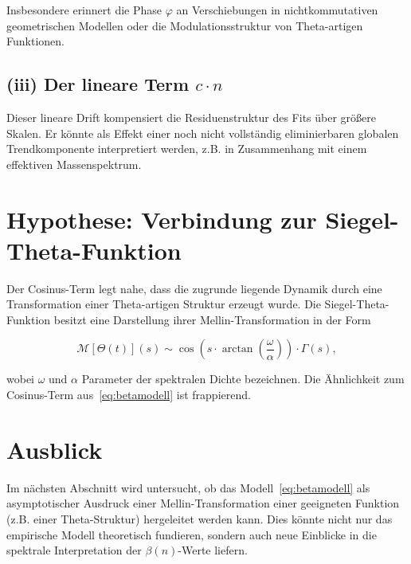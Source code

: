 \documentclass[a4paper,12pt]{article}
\begin{document}
Insbesondere erinnert die Phase $\varphi$ an Verschiebungen in nichtkommutativen geometrischen Modellen oder die Modulationsstruktur von Theta-artigen Funktionen.

\subsection*{(iii) Der lineare Term \boldmath$c \cdot n$}

Dieser lineare Drift kompensiert die Residuenstruktur des Fits über größere Skalen. Er könnte als Effekt einer noch nicht vollständig eliminierbaren globalen Trendkomponente interpretiert werden, z.B. in Zusammenhang mit einem effektiven Massenspektrum.

\section{Hypothese: Verbindung zur Siegel-Theta-Funktion}

Der Cosinus-Term legt nahe, dass die zugrunde liegende Dynamik durch eine Transformation einer Theta-artigen Struktur erzeugt wurde. Die Siegel-Theta-Funktion besitzt eine Darstellung ihrer Mellin-Transformation in der Form

\begin{equation}
\mathcal{M}[\Theta(t)](s) \sim \cos\left(s \cdot \arctan\left(\frac{\omega}{\alpha}\right)\right) \cdot \Gamma(s),
\end{equation}

wobei $\omega$ und $\alpha$ Parameter der spektralen Dichte bezeichnen. Die Ähnlichkeit zum Cosinus-Term aus~\eqref{eq:betamodell} ist frappierend.

\section{Ausblick}

Im nächsten Abschnitt wird untersucht, ob das Modell~\eqref{eq:betamodell} als asymptotischer Ausdruck einer Mellin-Transformation einer geeigneten Funktion (z.B. einer Theta-Struktur) hergeleitet werden kann. Dies könnte nicht nur das empirische Modell theoretisch fundieren, sondern auch neue Einblicke in die spektrale Interpretation der $\beta(n)$-Werte liefern.
\end{document}
